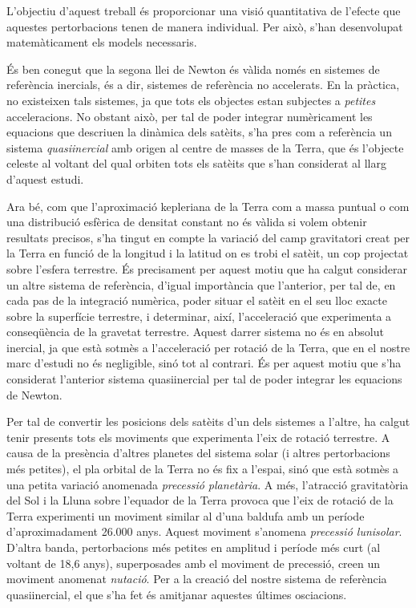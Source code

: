 \documentclass{article}
\begin{document}
L'objectiu d'aquest treball és proporcionar una visió quantitativa de l'efecte que aquestes pertorbacions tenen de manera individual. Per això, s'han desenvolupat matemàticament els models necessaris.

És ben conegut que la segona llei de Newton és vàlida només en sistemes de referència inercials, és a dir, sistemes de referència no accelerats. En la pràctica, no existeixen tals sistemes, ja que tots els objectes estan subjectes a \emph{petites} acceleracions. No obstant això, per tal de poder integrar numèricament les equacions que descriuen la dinàmica dels satè\lgem its, s'ha pres com a referència un sistema \emph{quasiinercial} amb origen al centre de masses de la Terra, que és l'objecte celeste al voltant del qual orbiten tots els satè\lgem its que s'han considerat al llarg d'aquest estudi.

Ara bé, com que l'aproximació kepleriana de la Terra com a massa puntual o com una distribució esfèrica de densitat constant no és vàlida si volem obtenir resultats precisos, s'ha tingut en compte la variació del camp gravitatori creat per la Terra en funció de la longitud i la latitud on es trobi el satè\lgem it, un cop projectat sobre l'esfera terrestre. És precisament per aquest motiu que ha calgut considerar un altre sistema de referència, d'igual importància que l'anterior, per tal de, en cada pas de la integració numèrica, poder situar el satè\lgem it en el seu lloc exacte sobre la superfície terrestre, i determinar, així, l'acceleració que experimenta a conseqüència de la gravetat terrestre. Aquest darrer sistema no és en absolut inercial, ja que està sotmès a l'acceleració per rotació de la Terra, que en el nostre marc d'estudi no és negligible, sinó tot al contrari. És per aquest motiu que s'ha considerat l'anterior sistema quasiinercial per tal de poder integrar les equacions de Newton.

Per tal de convertir les posicions dels satè\lgem its d'un dels sistemes a l'altre, ha calgut tenir presents tots els moviments que experimenta l'eix de rotació terrestre. A causa de la presència d'altres planetes del sistema solar (i altres pertorbacions més petites), el pla orbital de la Terra no és fix a l'espai, sinó que està sotmès a una petita variació anomenada \emph{precessió planetària}. A més, l'atracció gravitatòria del Sol i la Lluna sobre l'equador de la Terra provoca que l'eix de rotació de la Terra experimenti un moviment similar al d'una baldufa amb un període d'aproximadament 26.000 anys. Aquest moviment s'anomena \emph{precessió lunisolar}. D'altra banda, pertorbacions més petites en amplitud i període més curt (al voltant de 18,6 anys), superposades amb el moviment de precessió, creen un moviment anomenat \emph{nutació}. Per a la creació del nostre sistema de referència quasiinercial, el que s'ha fet és amitjanar aquestes últimes osci\lgem acions.
\end{document}
